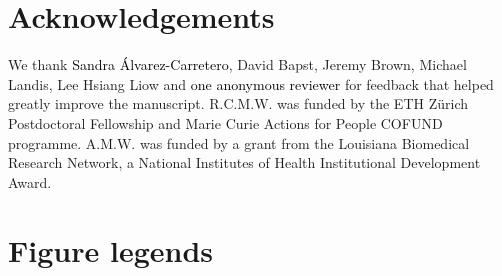 \documentclass{cup-elements}
\newcommand{\rev}[1]{{\textcolor{black}{#1}}} %
\begin{document}
\section*{Acknowledgements}
We thank \rev{Sandra \'Alvarez-Carretero}, David Bapst, Jeremy Brown, Michael Landis, Lee Hsiang Liow and \rev{one anonymous reviewer} for feedback that helped greatly improve the manuscript.
R.C.M.W. was funded by the ETH Z\"urich Postdoctoral Fellowship and Marie Curie Actions for People COFUND programme.
A.M.W. was funded by a grant from the Louisiana Biomedical Research Network, a National Institutes of Health Institutional Development Award.

\clearpage

\section*{Figure legends}

\begin{figure}[h!]
\centering

\end{figure}

\begin{figure}[h!]
\centering

\end{figure}

\begin{figure}[h!]
\centering

\end{figure}

\begin{figure}[h!]
\centering

\end{figure}

\begin{figure}
\centering

\end{figure}
\end{document}
